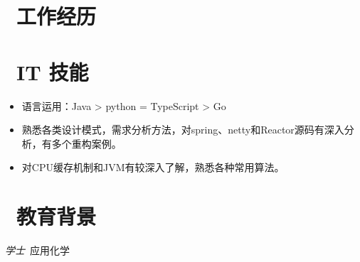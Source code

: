 \documentclass{resume}
\begin{document}
\section{\faUsers\ 工作经历}




\section{\faCogs\ IT 技能}
\begin{itemize}[parsep=0.5ex]
  \item 语言运用：Java > python = TypeScript > Go
  \item 熟悉各类设计模式，需求分析方法，对spring、netty和Reactor源码有深入分析，有多个重构案例。
  \item 对CPU缓存机制和JVM有较深入了解，熟悉各种常用算法。
\end{itemize}

\section{\faGraduationCap\  教育背景}
\textit{学士}\ 应用化学

\end{document}
